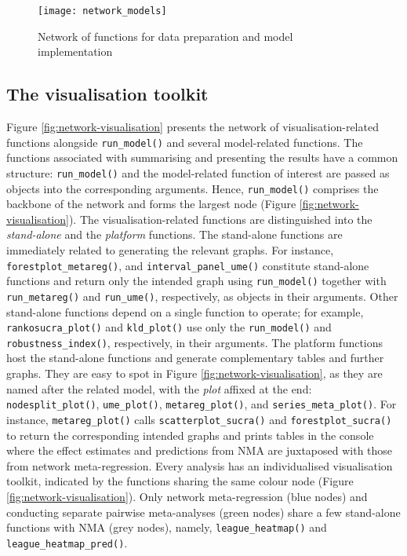\begin{figure}
\texttt{[image: network\_models]} \caption{Network of functions for data preparation and model implementation}\label{fig:network-models}
\end{figure}

\hypertarget{the-visualisation-toolkit}{%
\subsection{The visualisation toolkit}\label{the-visualisation-toolkit}}

Figure \ref{fig:network-visualisation} presents the network of visualisation-related functions alongside \texttt{run\_model()} and several model-related functions. The functions associated with summarising and presenting the results have a common structure: \texttt{run\_model()} and the model-related function of interest are passed as objects into the corresponding arguments. Hence, \texttt{run\_model()} comprises the backbone of the network and forms the largest node (Figure \ref{fig:network-visualisation}).
The visualisation-related functions are distinguished into the \emph{stand-alone} and the \emph{platform} functions. The stand-alone functions are immediately related to generating the relevant graphs. For instance, \texttt{forestplot\_metareg()}, and \texttt{interval\_panel\_ume()} constitute stand-alone functions and return only the intended graph using \texttt{run\_model()} together with \texttt{run\_metareg()} and \texttt{run\_ume()}, respectively, as objects in their arguments. Other stand-alone functions depend on a single function to operate; for example, \texttt{rankosucra\_plot()} and \texttt{kld\_plot()} use only the \texttt{run\_model()} and \texttt{robustness\_index()}, respectively, in their arguments. The platform functions host the stand-alone functions and generate complementary tables and further graphs. They are easy to spot in Figure \ref{fig:network-visualisation}, as they are named after the related model, with the \emph{plot} affixed at the end: \texttt{nodesplit\_plot()}, \texttt{ume\_plot()}, \texttt{metareg\_plot()}, and \texttt{series\_meta\_plot()}. For instance,
\texttt{metareg\_plot()} calls \texttt{scatterplot\_sucra()} and \texttt{forestplot\_sucra()} to return the corresponding intended graphs and prints tables in the console where the effect estimates and predictions from NMA are juxtaposed with those from network meta-regression. Every analysis has an individualised visualisation toolkit, indicated by the functions sharing the same colour node (Figure \ref{fig:network-visualisation}). Only network meta-regression (blue nodes) and conducting separate pairwise meta-analyses (green nodes) share a few stand-alone functions with NMA (grey nodes),
namely, \texttt{league\_heatmap()} and \texttt{league\_heatmap\_pred()}.

